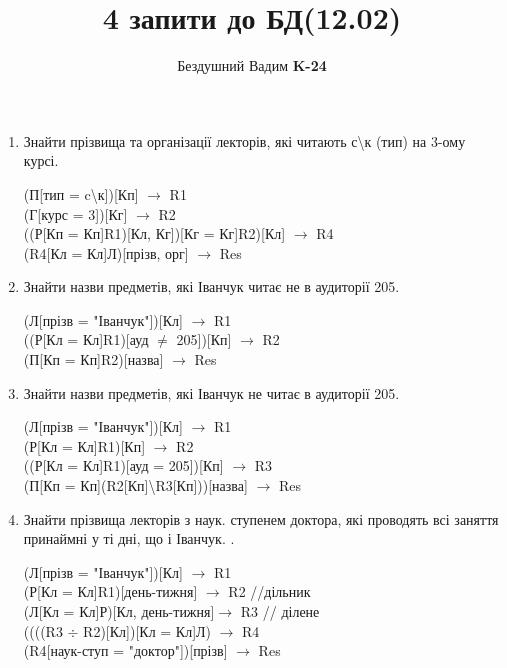 \documentclass[a4paper, 12pt]{article}
\title{4 запити до БД(12.02)}
\author{Бездушний Вадим \textbf{K-24}}
\date{}
\begin{document}
\maketitle
\begin{enumerate}
\item{Знайти прізвища та організації лекторів, які читають с\textbackslash к (тип) на 3-ому курсі.
\begin{test-answer}
	(П[тип = c\textbackslash к])[Кп] $\rightarrow$ R1\\
	(Г[курс = 3])[Кг] $\rightarrow$ R2\\
	((Р[Кп = Кп]R1)[Кл, Кг])[Кг = Кг]R2)[Кл] $\rightarrow$ R4\\
	(R4[Кл = Кл]Л)[прізв, орг] $\rightarrow$ Res
\end{test-answer}
}
\item{Знайти назви предметів, які Іванчук читає не в аудиторії 205.
\begin{test-answer}
	(Л[прізв = "Іванчук"])[Кл] $\rightarrow$ R1\\
	((Р[Кл = Кл]R1)[ауд $\neq$ 205])[Кп] $\rightarrow$ R2\\
	(П[Кп = Кп]R2)[назва] $\rightarrow$ Res
\end{test-answer}
}

\item{Знайти назви предметів, які Іванчук не читає в аудиторії 205.
\begin{test-answer}
	(Л[прізв = "Іванчук"])[Кл] $\rightarrow$ R1\\
	(Р[Кл = Кл]R1)[Кп] $\rightarrow$ R2\\
	((Р[Кл = Кл]R1)[ауд = 205])[Кп] $\rightarrow$ R3\\
	(П[Кп = Кп](R2[Кп]\textbackslash R3[Кп]))[назва] $\rightarrow$ Res
\end{test-answer}
}

\item{Знайти прізвища лекторів з наук. ступенем доктора, які проводять всі заняття принаймні у ті дні, що і Іванчук. .
\begin{test-answer}
	(Л[прізв = "Іванчук"])[Кл] $\rightarrow$ R1\\
	(Р[Кл = Кл]R1)[день-тижня] $\rightarrow$ R2 //дільник\\
	(Л[Кл = Кл]Р)[Кл, день-тижня]$\rightarrow$ R3 // ділене\\
	((((R3 $\div$ R2)[Кл])[Кл = Кл]Л) $\rightarrow$ R4 \\
	(R4[наук-ступ = "доктор"])[прізв] $\rightarrow$ Res
\end{test-answer}
}

\end{enumerate}
\end{document}
